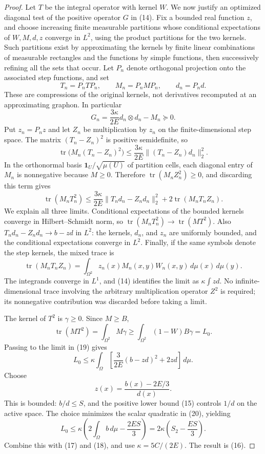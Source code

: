 \documentclass[11pt]{amsart}
\theoremstyle{definition}
\theoremstyle{remark}
\begin{document}
\begin{proof}
Let \(T\) be the integral operator with kernel \(W\). We now justify an
optimized diagonal test of the positive operator \(G\) in (14). Fix a
bounded real function \(z\), and choose increasing finite measurable
partitions whose conditional expectations of \(W,M,d,z\) converge in
\(L^2\), using the product partitions for the two kernels. Such partitions
exist by approximating the kernels by finite linear combinations of
measurable rectangles and the functions by simple functions, then
successively refining all the sets that occur. Let \(P_n\) denote
orthogonal projection onto the associated step functions, and set
\[
 T_n=P_nTP_n,\qquad M_n=P_nMP_n,\qquad d_n=P_nd.
\]
These are compressions of the original kernels, not derivatives recomputed
at an approximating graphon. In particular
\[
 G_n=\frac{3\kappa}{2E}d_n\otimes d_n-M_n\succeq0.
\]
Put \(z_n=P_nz\) and let \(Z_n\) be
multiplication by \(z_n\) on the finite-dimensional step space. The matrix
\((T_n-Z_n)^2\) is positive semidefinite, so
\[
 \operatorname{tr}\bigl(M_n(T_n-Z_n)^2\bigr)
       \le\frac{3\kappa}{2E}\|(T_n-Z_n)d_n\|_2^2.
\]
In the orthonormal basis \(\mathbf1_U/\sqrt{\mu(U)}\) of partition cells,
each diagonal entry of \(M_n\) is nonnegative because \(M\ge0\).
Therefore \(\operatorname{tr}(M_nZ_n^2)\ge0\), and discarding this term
gives
\begin{equation}
 \operatorname{tr}(M_nT_n^2)
 \le\frac{3\kappa}{2E}\|T_nd_n-Z_nd_n\|_2^2
                 +2\operatorname{tr}(M_nT_nZ_n).\tag{19}
\end{equation}
We explain all three limits. Conditional expectations of the bounded
kernels converge in Hilbert--Schmidt norm, so
\(\operatorname{tr}(M_nT_n^2)\to\operatorname{tr}(MT^2)\). Also
\(T_nd_n-Z_nd_n\to b-zd\) in \(L^2\): the kernels, \(d_n\), and \(z_n\)
are uniformly bounded, and the conditional expectations converge in
\(L^2\). Finally, if the same symbols denote the step kernels, the mixed
trace is
\[
 \operatorname{tr}(M_nT_nZ_n)
   =\int_{\Omega^2}z_n(x)M_n(x,y)W_n(x,y)\,d\mu(x)\,d\mu(y).
\]
The integrands converge in \(L^1\), and (14) identifies the limit as
\(\kappa\int zd\). No infinite-dimensional trace involving the arbitrary
multiplication operator \(Z^2\) is required; its nonnegative contribution
was discarded before taking a limit.

The kernel of \(T^2\) is \(\gamma\ge0\). Since \(M\ge B\),
\[
 \operatorname{tr}(MT^2)=\int_{\Omega^2}M\gamma
       \ge\int_{\Omega^2}(1-W)B\gamma=L_0.
\]
Passing to the limit in (19) gives
\begin{equation}
 L_0\le\kappa\int_\Omega
       \left[\frac{3}{2E}(b-zd)^2+2zd\right]\,d\mu.\tag{20}
\end{equation}
Choose
\[
 z(x)=\frac{b(x)-2E/3}{d(x)}.
\]
This is bounded: \(b/d\le S\), and the positive lower bound (15)
controls \(1/d\) on the active space. The choice minimizes the scalar
quadratic in (20), yielding
\[
 L_0\le\kappa\left(2\int_\Omega b\,d\mu-\frac{2ES}{3}\right)
       =2\kappa\left(S_2-\frac{ES}{3}\right).
\]
Combine this with (17) and (18), and use \(\kappa=5C/(2E)\).
The result is (16).
\end{proof}
\end{document}
